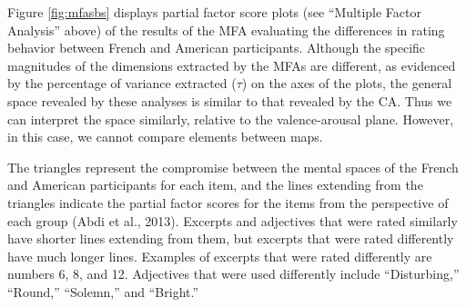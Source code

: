 \documentclass[
  english,
  man,floatsintext]{apa6}
\begin{document}
Figure \ref{fig:mfasbs} displays partial factor score plots (see ``Multiple Factor Analysis'' above) of the results of the MFA evaluating the differences in rating behavior between French and American participants. Although the specific magnitudes of the dimensions extracted by the MFAs are different, as evidenced by the percentage of variance extracted (\(\tau\)) on the axes of the plots, the general space revealed by these analyses is similar to that revealed by the CA. Thus we can interpret the space similarly, relative to the valence-arousal plane. However, in this case, we cannot compare elements between maps.

The triangles represent the compromise between the mental spaces of the French and American participants for each item, and the lines extending from the triangles indicate the partial factor scores for the items from the perspective of each group (Abdi et al., 2013). Excerpts and adjectives that were rated similarly have shorter lines extending from them, but excerpts that were rated differently have much longer lines. Examples of excerpts that were rated differently are numbers 6, 8, and 12. Adjectives that were used differently include ``Disturbing,'' ``Round,'' ``Solemn,'' and ``Bright.''
\end{document}
